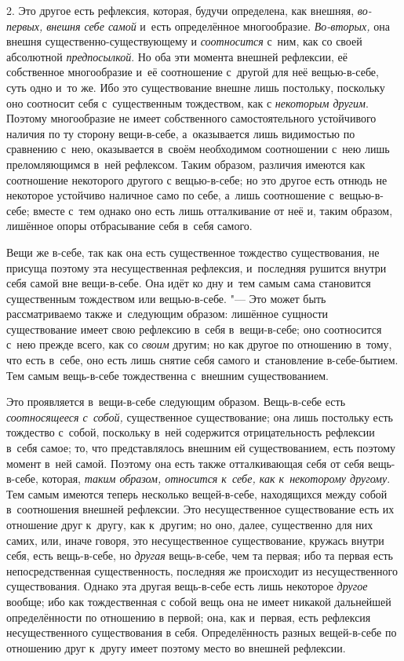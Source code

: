 2. Это другое есть рефлексия, которая, будучи определена, как внешняя,
{\em во-первых, внешня себе самой} и~есть определённое многообразие.
{\em Во-вторых,} она внешня существенно-существующему и
{\em соотносится} с~ним, как со своей абсолютной
{\em предпосылкой}. Но оба эти момента внешней
рефлексии, её собственное многообразие и~её соотношение с~другой для неё
вещью-в-себе, суть одно и~то же. Ибо это существование внешне лишь
постольку, поскольку оно соотносит себя с~существенным тождеством, как с
{\em некоторым другим}. Поэтому многообразие не имеет
собственного самостоятельного устойчивого наличия по ту сторону
вещи-в-себе, а~оказывается лишь видимостью по сравнению с~нею, оказывается
в~своём необходимом соотношении с~нею лишь преломляющимся в~ней рефлексом.
Таким образом, различия имеются как соотношение некоторого другого с
вещью-в-себе; но это другое есть отнюдь не некоторое устойчиво наличное
само по себе, а~лишь соотношение с~вещью-в-себе; вместе с~тем однако оно
есть лишь отталкивание от неё и, таким образом, лишённое опоры отбрасывание
себя в~себя самого.

Вещи же в-себе, так как она есть существенное тождество существования, не
присуща поэтому эта несущественная рефлексия, и~последняя рушится внутри
себя самой вне вещи-в-себе. Она идёт ко дну и~тем самым сама становится
существенным тождеством или вещью-в-себе. "--- Это может быть рассматриваемо
также и~следующим образом: лишённое сущности существование имеет свою
рефлексию в~себя в~вещи-в-себе; оно соотносится с~нею прежде всего, как со
{\em своим} другим; но как другое по отношению в~тому,
что есть в~себе, оно есть лишь снятие себя самого и~становление
в-себе-бытием. Тем самым вещь-в-себе тождественна с~внешним существованием.

Это проявляется в~вещи-в-себе следующим образом. Вещь-в-себе есть
{\em соотносящееся с~собой,} существенное
существование; она лишь постольку есть тождество с~собой, поскольку в~ней
содержится отрицательность рефлексии в~себя самое; то, что представлялось
внешним ей существованием, есть поэтому момент в~ней самой. Поэтому она
есть также отталкивающая себя от себя вещь-в-себе, которая,
{\em таким образом, относится к~себе, как к~некоторому
другому}. Тем самым имеются теперь несколько вещей-в-себе, находящихся
между собой в~соотношения внешней рефлексии. Это несущественное
существование есть их отношение друг к~другу, как к~другим; но оно, далее,
существенно для них самих, или, иначе говоря, это несущественное
существование, кружась внутри себя, есть вещь-в-себе, но
{\em другая} вещь-в-себе, чем та первая; ибо та первая
есть непосредственная существенность, последняя же происходит из
несущественного существования. Однако эта другая вещь-в-себе есть лишь
некоторое {\em другое} вообще; ибо как тождественная с
собой вещь она не имеет никакой дальнейшей определённости по отношению в
первой; она, как и~первая, есть рефлексия несущественного существования в
себя. Определённость разных вещей-в-себе по отношению друг к~другу имеет
поэтому место во внешней рефлексии.

